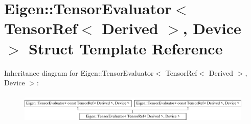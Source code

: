 \hypertarget{struct_eigen_1_1_tensor_evaluator_3_01_tensor_ref_3_01_derived_01_4_00_01_device_01_4}{}\section{Eigen\+:\+:Tensor\+Evaluator$<$ Tensor\+Ref$<$ Derived $>$, Device $>$ Struct Template Reference}
\label{struct_eigen_1_1_tensor_evaluator_3_01_tensor_ref_3_01_derived_01_4_00_01_device_01_4}
Inheritance diagram for Eigen\+:\+:Tensor\+Evaluator$<$ Tensor\+Ref$<$ Derived $>$, Device $>$\+:\begin{figure}[H]
\begin{center}
\leavevmode
\includegraphics[height=1.450777cm]{struct_eigen_1_1_tensor_evaluator_3_01_tensor_ref_3_01_derived_01_4_00_01_device_01_4}
\end{center}
\end{figure}
